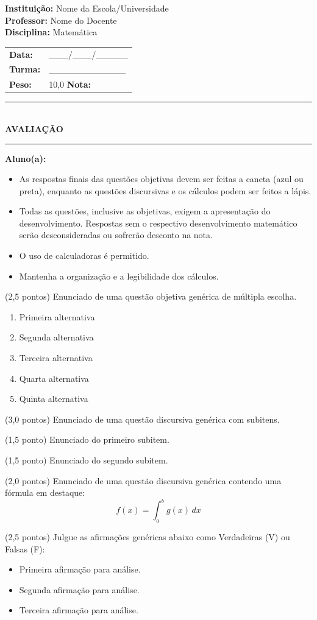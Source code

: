 \documentclass[12pt,a4paper]{article}
\makeatletter
\newcommand{\cabecalho}{
  \noindent
  \begin{minipage}[t]{0.5\textwidth}
    \vspace{0pt}
    \textbf{Instituição:} Nome da Escola/Universidade \\[4pt]
    \textbf{Professor:} Nome do Docente \\[4pt]
    \textbf{Disciplina:} Matemática
  \end{minipage}%
  \begin{minipage}[t]{0.5\textwidth}
    \vspace{0pt}
    \raggedleft
    \begin{tabular}{@{}ll@{}}
      \textbf{Data:}  & \_\_\_/\_\_\_/\_\_\_\_\_ \\[4pt] 
      \textbf{Turma:} & \_\_\_\_\_\_\_\_\_\_\_\_ \\[4pt]
      \textbf{Peso:}  & 10,0 \hspace{0.5cm} \textbf{Nota:}
    \end{tabular}
  \end{minipage}
  \vspace{0.5cm}
  \begin{center}
    \rule{\textwidth}{0.4pt} \\
    \vspace{0.2cm}
    {\large \textbf{AVALIAÇÃO}} \\
    \rule{\textwidth}{0.4pt}
  \end{center}
  \vspace{0.3cm}
  \noindent \textbf{Aluno(a):} \hrulefill
  \vspace{0.8cm}
}
\makeatother
\begin{document}
\cabecalho

\begin{instrucoes}
  \begin{itemize}[leftmargin=1.5em]
    \item As respostas finais das questões objetivas devem ser feitas a caneta (azul ou preta), enquanto as questões discursivas e os cálculos podem ser feitos a lápis.
    \item Todas as questões, inclusive as objetivas, exigem a apresentação do desenvolvimento. Respostas sem o respectivo desenvolvimento matemático serão desconsideradas ou sofrerão desconto na nota.
    \item O uso de calculadoras é permitido.
    \item Mantenha a organização e a legibilidade dos cálculos.
  \end{itemize}
\end{instrucoes}

\vspace{0.5cm}

\begin{questoes}

  \item (2,5 pontos) Enunciado de uma questão objetiva genérica de múltipla escolha.
  \begin{enumerate}[label=\alph*)]
    \item Primeira alternativa
    \item Segunda alternativa
    \item Terceira alternativa
    \item Quarta alternativa
    \item Quinta alternativa
  \end{enumerate}

  \item (3,0 pontos) Enunciado de uma questão discursiva genérica com subitens.
  \begin{questoes}
    \item (1,5 ponto) Enunciado do primeiro subitem.
    \item (1,5 ponto) Enunciado do segundo subitem.
  \end{questoes}
  \vspace{4cm} %

  \item (2,0 pontos) Enunciado de uma questão discursiva genérica contendo uma fórmula em destaque:
  \[ f(x) = \int_{a}^{b} g(x) \, dx \]
  \vspace{5cm}

  \item (2,5 pontos) Julgue as afirmações genéricas abaixo como Verdadeiras (V) ou Falsas (F):
  \begin{itemize}[label=\(\square\)]
    \item Primeira afirmação para análise.
    \item Segunda afirmação para análise.
    \item Terceira afirmação para análise.
  \end{itemize}

\end{questoes}
\end{document}
